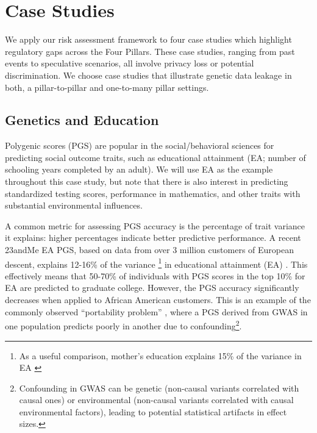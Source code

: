\section{Case Studies}

\label{sec:studies}

We apply our risk assessment framework to four case studies which highlight regulatory gaps across the Four Pillars. These case studies, ranging from past events to speculative scenarios, all involve privacy loss or potential discrimination. We choose case studies that illustrate genetic data leakage in both, a pillar-to-pillar and one-to-many pillar settings.


\subsection{Genetics and Education}
\label{case:education}

Polygenic scores (PGS) are popular in the social/behavioral sciences for predicting social outcome traits, such as educational attainment (EA; number of schooling years completed by an adult). We will use EA as the example throughout this case study, but note that there is also interest in predicting standardized testing scores, performance in mathematics, and other traits with substantial environmental influences. 


A common metric for assessing PGS accuracy is the percentage of trait variance it explains: higher percentages indicate better predictive performance. A recent 23andMe EA PGS, based on data from over 3 million customers of European descent, explains 12-16\% of the variance \footnote{As a useful comparison, mother's education explains 15\% of the variance in EA \cite{lee_gene_2018}} in educational attainment (EA) \cite{okbay_polygenic_2022}. This effectively means that 50-70\% of individuals with PGS scores in the top 10\% for EA are predicted to graduate college. However, the PGS accuracy significantly decreases when applied to African American customers. This is an example of the commonly observed ``portability problem'' \cite{martin_human_2017}, where a PGS derived from GWAS in one population predicts poorly in another due to confounding\footnote{Confounding in GWAS can be genetic (non-causal variants correlated with causal ones) or environmental (non-causal variants correlated with causal environmental factors), leading to potential statistical artifacts in effect sizes.}.


